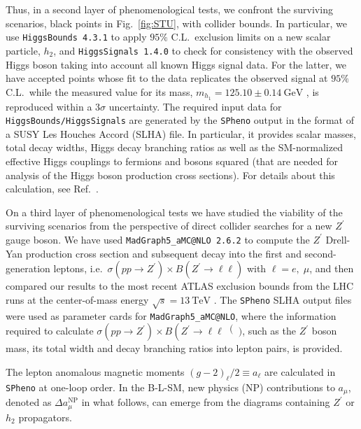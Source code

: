 
Thus, in a second layer of phenomenological tests, we confront the surviving scenarios, black points in Fig.~\ref{fig:STU}, with collider bounds. In particular, we use \texttt{HiggsBounds 4.3.1} \cite{Bechtle:2013wla} to apply $95\%$ C.L.~exclusion limits on a new scalar particle, $h_2$, and \texttt{HiggsSignals 1.4.0} \cite{Bechtle:2013xfa} to check for consistency with the observed Higgs boson taking into account all known Higgs signal data. For the latter, we have accepted points whose fit to the data replicates the observed signal at $95\%$ C.L.~while the measured value for its mass, $m_{h_1} = 125.10 \pm 0.14~\textrm{GeV}$ \cite{Tanabashi:2018oca}, is reproduced within a $3\sigma$ uncertainty. The required input data for \texttt{HiggsBounds/HiggsSignals} are generated by the \texttt{SPheno} output in the format of a SUSY Les Houches Accord (SLHA) \cite{Skands:2003cj} file. In particular, it provides scalar masses, total decay widths, Higgs decay branching ratios as well as the SM-normalized effective Higgs couplings to fermions and bosons squared (that are needed for analysis of the Higgs boson production cross sections). For details about this calculation, see Ref.~\cite{Bechtle:2013wla}.
 
On a third layer of phenomenological tests we have studied the viability of the surviving scenarios from the perspective of direct collider searches for a new $Z^\prime$ gauge boson. We have used \texttt{MadGraph5\_aMC@NLO 2.6.2} \cite{Alwall:2014hca} to compute the $Z^\prime$ Drell-Yan production cross section and subsequent decay into the first and second-generation leptons, i.e.~$ \sigma \left( pp \to Z^\prime \right) \times B \left( Z^\prime \to \ell \ell\right)$ with $\ell = e,\; \mu$, and then compared our results to the most recent ATLAS exclusion bounds from the LHC runs at the center-of-mass energy $\sqrt{s} = 13~\textrm{TeV}$ \cite{Aaboud:2017buh}. The \texttt{SPheno} SLHA output files were used as parameter cards for \texttt{MadGraph5\_aMC@NLO}, where the information required to calculate $ \sigma\left(pp \to Z^\prime\right) \times B\left(Z^\prime \to \ell \ell\right()$, such as the $Z^\prime$ boson mass, its total width and decay branching ratios into lepton pairs, is provided. 

The lepton anomalous magnetic moments $\left( g-2 \right)_\ell /2 \equiv a_\ell$ are calculated in \texttt{SPheno} at one-loop order. In the B-L-SM, new physics (NP) contributions to $a_\mu$, denoted as $\Delta a_\mu^{\textrm{NP}}$ in what follows, can emerge from the diagrams containing $Z^\prime$ or $h_2$ propagators. 

